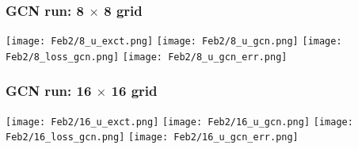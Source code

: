 \documentclass{beamer}
\newcommand{\fr}[2]{
	\begin{frame}
		\frametitle{#1}
		#2
	\end{frame}
}
\begin{document}
\fr{GCN run: 8 $\times$ 8 grid}{
\begin{center}
	\texttt{[image: Feb2/8\_u\_exct.png]}
	\texttt{[image: Feb2/8\_u\_gcn.png]}
	\texttt{[image: Feb2/8\_loss\_gcn.png]}
	\texttt{[image: Feb2/8\_u\_gcn\_err.png]}
\end{center}
}

\fr{GCN run: 16 $\times$ 16 grid}{
\begin{center}
	\texttt{[image: Feb2/16\_u\_exct.png]}
	\texttt{[image: Feb2/16\_u\_gcn.png]}
	\texttt{[image: Feb2/16\_loss\_gcn.png]}
	\texttt{[image: Feb2/16\_u\_gcn\_err.png]}
\end{center}
}
\end{document}
